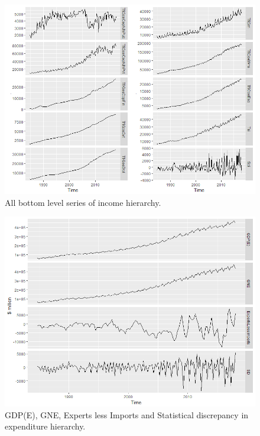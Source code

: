 \documentclass[graybox]{svmult}
\begin{document}
\begin{figure}[H]
	\centering
	\small
	\includegraphics[scale=0.5]{Figs/TS-plots/INC-hierarchy/INC-bottomlevel-TSplots.png}
	\caption{All bottom level series of income hierarchy.}\label{INC-bottomlevel_TSplot}
\end{figure}

\begin{figure}[H]
	\centering
	\small
	\includegraphics[scale=0.5]{Figs/TS-plots/EXP-hierarchy/set-1.png}
	\caption{GDP(E), GNE, Experts less Imports and Statistical discrepancy in expenditure hierarchy.}\label{EXP-set-1}
\end{figure}
\end{document}
